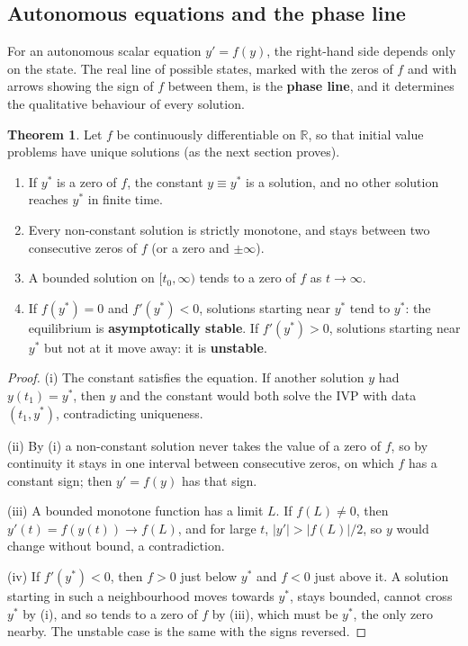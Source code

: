 \documentclass[11pt,a4paper]{article}
\numberwithin{equation}{section}
\theoremstyle{definition}
\newtheorem{thm}{Theorem}[subsection]
\begin{document}
\subsection{Autonomous equations and the phase line}
\label{ssec:phaseline}

For an autonomous scalar equation $y' = f(y)$, the right-hand side depends only on the state. The real line of possible states, marked with the zeros of
$f$ and with arrows showing the sign of $f$ between them, is the \textbf{phase line}, and it determines the qualitative behaviour of every solution.

\begin{thm}
\label{thm:phaseline}
Let $f$ be continuously differentiable on $\mathbb R$, so that initial value problems have unique solutions (as the next section proves).
\begin{enumerate}[label=(\roman*)]
\item If $y^*$ is a zero of $f$, the constant $y \equiv y^*$ is a solution, and no other solution reaches $y^*$ in finite time.
\item Every non-constant solution is strictly monotone, and stays between two consecutive zeros of $f$ (or a zero and $\pm\infty$).
\item A bounded solution on $[t_0, \infty)$ tends to a zero of $f$ as $t \to \infty$.
\item If $f(y^*) = 0$ and $f'(y^*) < 0$, solutions starting near $y^*$ tend to $y^*$: the equilibrium is \textbf{asymptotically stable}. If $f'(y^*) > 0$, solutions starting near
$y^*$ but not at it move away: it is \textbf{unstable}.
\end{enumerate}
\end{thm}

\begin{proof}
(i) The constant satisfies the equation. If another solution $y$ had $y(t_1) = y^*$, then $y$ and the constant would both solve the IVP with data $(t_1, y^*)$, contradicting
uniqueness.

(ii) By (i) a non-constant solution never takes the value of a zero of $f$, so by continuity it stays in one interval between consecutive zeros, on
which $f$ has a constant sign; then $y' = f(y)$ has that sign.

(iii) A bounded monotone function has a limit $L$. If $f(L) \neq 0$, then $y'(t) = f(y(t)) \to f(L)$, and for large $t$, $|y'| > |f(L)|/2$, so $y$ would change without bound, a
contradiction.

(iv) If $f'(y^*) < 0$, then $f > 0$ just below $y^*$ and $f < 0$ just above it. A solution starting in such a neighbourhood moves towards $y^*$, stays bounded, cannot cross $y^*$
by (i), and so tends to a zero of $f$ by (iii), which must be $y^*$, the only zero nearby. The unstable case is the same with the signs reversed.
\end{proof}
\end{document}
